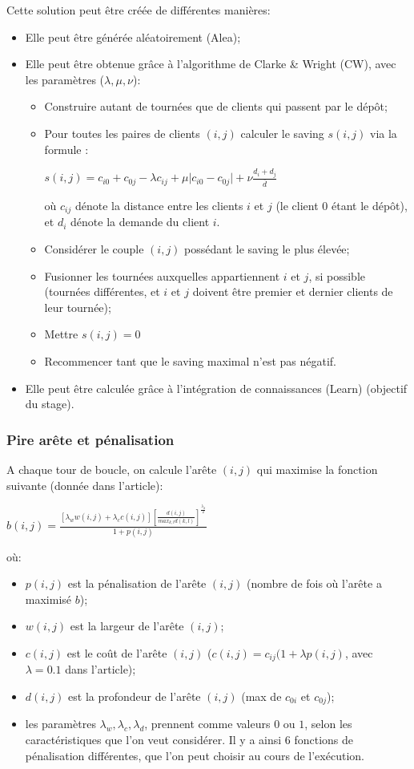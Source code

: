 \documentclass[a4paper,11pt]{article}%
\begin{document}
Cette solution peut être créée de différentes manières:

\begin{itemize}
\item Elle peut être générée aléatoirement (Alea);
\item Elle peut être obtenue grâce à l'algorithme de Clarke \& Wright (CW), avec les paramètres ($\lambda,\mu,\nu$):
\begin{itemize}
\item Construire autant de tournées que de clients qui passent par le dépôt;
\item Pour toutes les paires de clients $(i,j)$ calculer le saving $s(i,j)$ via la formule : 
\begin{center}
$s(i,j) = c_{i0} + c_{0j} - \lambda c_{ij} + \mu \vert c_{i0} - c_{0j} \vert + \nu \frac{d_i + d_j}{\overline{d}}$
\end{center}
où $c_{ij}$ dénote la distance entre les clients $i$ et $j$ (le client 0 étant le dépôt), et $d_i$ dénote la demande du client $i$.
\item Considérer le couple $(i,j)$ possédant le saving le plus élevée;
\item Fusionner les tournées auxquelles appartiennent $i$ et $j$, si possible (tournées différentes, et $i$ et $j$ doivent être premier et dernier clients de leur tournée);
\item Mettre $s(i,j) = 0$
\item Recommencer tant que le saving maximal n'est pas négatif.
\end{itemize}
\item Elle peut être calculée grâce à l'intégration de connaissances (Learn) (objectif du stage).
\end{itemize}


\subsubsection{Pire arête et pénalisation}
A chaque tour de boucle, on calcule l'arête $(i,j)$ qui maximise la fonction suivante (donnée dans l'article):
\begin{center}
$b(i,j) = \frac{[\lambda_w w(i,j) + \lambda_c c(i,j)] [\frac{d(i,j)}{max_{k,l}d(k,l)}] ^ {\frac{\lambda_d}{2}}}{1+p(i,j)}$
\end{center}
où:
\begin{itemize}
\item $p(i,j)$ est la pénalisation de l'arête $(i,j)$ (nombre de fois où l'arête a maximisé $b$);
\item $w(i,j)$ est la largeur de l'arête $(i,j)$;
\item $c(i,j)$ est le coût de l'arête $(i,j)$ ($c(i,j) = c_{ij}(1 + \lambda p(i,j)$, avec $\lambda = 0.1$ dans l'article);
\item $d(i,j)$ est la profondeur de l'arête $(i,j)$ (max de $c_{0i}$ et $c_{0j}$);
\item les paramètres $\lambda_w,\lambda_c,\lambda_d$, prennent comme valeurs $0$ ou $1$, selon les caractéristiques que l'on veut considérer. Il y a ainsi 6 fonctions de pénalisation différentes, que l'on peut choisir au cours de l'exécution.

\end{itemize}
\end{document}
